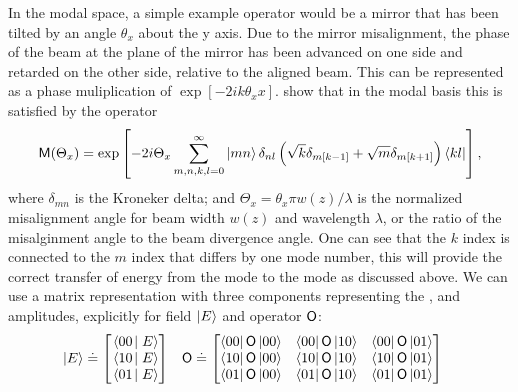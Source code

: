 In the modal space, a simple example operator would be a mirror that has been tilted by an angle $\theta_x$ about the y axis. %
Due to the mirror misalignment, the phase of the beam at the plane of the mirror has been advanced on one side and retarded on the other side, relative to the aligned beam. %
This can be represented as a phase muliplication of $\exp[-2ik\theta_x x]$. %
\citet{Hefetz:97} show that in the modal basis this is satisfied by the operator
\begin{equation}
\mathsf{M}(\Theta_x) = \exp\left[ -2i\Theta_x\sum_{m,n,k,l=0}^\infty \left| mn \right> \delta_{nl} \left( \sqrt k \delta_{m[k-1]}+\sqrt m \delta_{m[k+1]} \right) \left< kl \right|\right],
\end{equation}
where $\delta_{mn}$ is the Kroneker delta; and $\Theta_x = \theta_x \pi w(z)/\lambda$ is the normalized misalignment angle for beam width $w(z)$ and wavelength $\lambda$, or the ratio of the misalginment angle to the beam divergence angle. %
One can see that the $k$ index is connected to the $m$ index that differs by one mode number, this will provide the correct transfer of energy from the  mode to the  mode as discussed above. %
We can use a matrix representation with three components representing the ,  and  amplitudes, explicitly for field $\left| E \right>$ and operator $\mathsf{O}$:
\begin{align}
\vect{E} &\doteq \ms \inprod{00}{E} \\ \inprod{10}{E} \\ \inprod{01}{E} \me
& \oper{O} &\doteq \ms 
\matrixel{00}{\oper{O}}{00} & \matrixel{00}{\oper{O}}{10} & \matrixel{00}{\oper{O}}{01} \\
\matrixel{10}{\oper{O}}{00} & \matrixel{10}{\oper{O}}{10} & \matrixel{10}{\oper{O}}{01} \\
\matrixel{01}{\oper{O}}{00} & \matrixel{01}{\oper{O}}{10} & \matrixel{01}{\oper{O}}{01} \me
\end{align}

